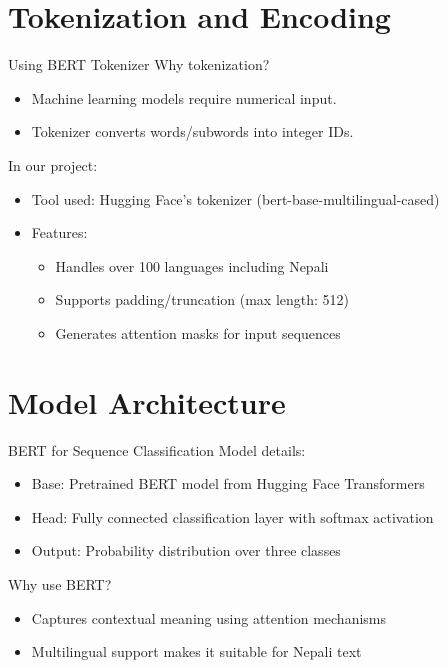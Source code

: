 \documentclass[aspectratio=169]{beamer}
\begin{document}
\section{Tokenization and Encoding}
\begin{frame}{Using BERT Tokenizer}
  Why tokenization?
  \begin{itemize}
    \item Machine learning models require numerical input.
    \item Tokenizer converts words/subwords into integer IDs.
  \end{itemize}

  In our project:
  \begin{itemize}
    \item Tool used: Hugging Face’s tokenizer (bert-base-multilingual-cased)
    \item Features:
    \begin{itemize}
      \item Handles over 100 languages including Nepali
      \item Supports padding/truncation (max length: 512)
      \item Generates attention masks for input sequences
    \end{itemize}
  \end{itemize}
\end{frame}

\section{Model Architecture}
\begin{frame}{BERT for Sequence Classification}
  Model details:
  \begin{itemize}
    \item Base: Pretrained BERT model from Hugging Face Transformers
    \item Head: Fully connected classification layer with softmax activation
    \item Output: Probability distribution over three classes
  \end{itemize}

  Why use BERT?
  \begin{itemize}
    \item Captures contextual meaning using attention mechanisms
    \item Multilingual support makes it suitable for Nepali text
  \end{itemize}
\end{frame}
\end{document}
